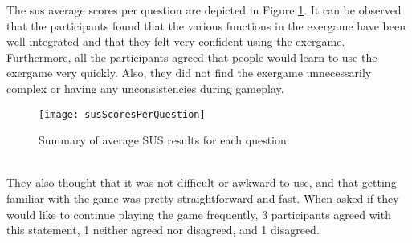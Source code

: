The \acrshort{sus} average scores per question are depicted in Figure \ref{fig:susPerQuestion}. It can be observed that the participants found that the various functions in the exergame have been well integrated and that they felt very confident using the exergame. Furthermore, all the participants agreed that people would learn to use the exergame very quickly. Also, they did not find the exergame unnecessarily complex or having any unconsistencies during gameplay.\\
\begin{figure}[h]
    \centering
    \texttt{[image: susScoresPerQuestion]}
    \caption{Summary of average SUS results for each question.}
    \label{fig:susPerQuestion}
\end{figure}\\ They also thought that it was not difficult or awkward to use, and that getting familiar with the game was pretty straightforward and fast. When asked if they would like to continue playing the game frequently, 3 participants agreed with this statement, 1  neither agreed nor disagreed, and 1 disagreed. 


